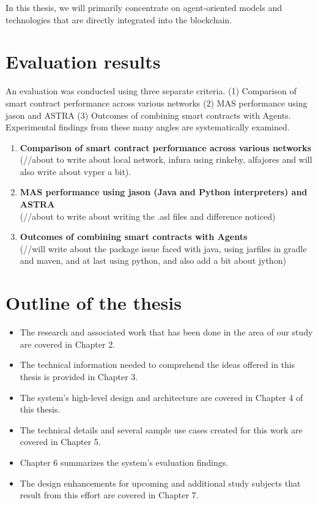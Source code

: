 In this thesis, we will primarily concentrate on agent-oriented models and technologies that are directly integrated into the blockchain.

\section{Evaluation results}

An evaluation was conducted using three separate criteria. (1) Comparison of smart contract performance across various networks (2) \ac{MAS} performance using jason and \ac{ASTRA} (3) Outcomes of combining smart contracts with Agents. Experimental findings from these many angles are systematically examined.

\newcommand\descitem[1]{\item{\bfseries #1}\\}
\begin{enumerate}
  \descitem{Comparison of smart contract performance across various networks} (//about to write about local network, infura using rinkeby, alfajores and will also write about vyper a bit).
  \descitem{\ac{MAS} performance using jason (Java and Python interpreters) and \ac{ASTRA}} (//about to write about writing the .asl files and difference noticed)
  \descitem{Outcomes of combining smart contracts with Agents} (//will write about the package issue faced with java, using jarfiles in gradle and maven, and at last using python, and also add a bit about jython)
\end{enumerate}


\section{Outline of the thesis}
\begin{itemize}
    \item The research and associated work that has been done in the area of our study are covered in Chapter 2.
    \item The technical information needed to comprehend the ideas offered in this thesis is provided in Chapter 3.
    \item The system's high-level design and architecture are covered in Chapter 4 of this thesis.
    \item The technical details and several sample use cases created for this work are covered in Chapter 5.
    \item Chapter 6 summarizes the system's evaluation findings.
    \item The design enhancements for upcoming and additional study subjects that result from this effort are covered in Chapter 7.
\end{itemize}